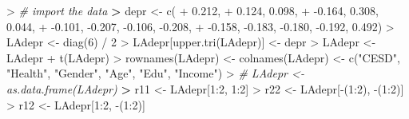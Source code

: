 \documentclass[
]{article}
\newenvironment{Shaded}{\begin{snugshade}}{\end{snugshade}}
\newcommand{\CommentTok}[1]{\textcolor[rgb]{0.56,0.35,0.01}{\textit{#1}}}
\newcommand{\DecValTok}[1]{\textcolor[rgb]{0.00,0.00,0.81}{#1}}
\newcommand{\ErrorTok}[1]{\textcolor[rgb]{0.64,0.00,0.00}{\textbf{#1}}}
\newcommand{\FloatTok}[1]{\textcolor[rgb]{0.00,0.00,0.81}{#1}}
\newcommand{\FunctionTok}[1]{\textcolor[rgb]{0.00,0.00,0.00}{#1}}
\newcommand{\NormalTok}[1]{#1}
\newcommand{\OtherTok}[1]{\textcolor[rgb]{0.56,0.35,0.01}{#1}}
\newcommand{\SpecialCharTok}[1]{\textcolor[rgb]{0.00,0.00,0.00}{#1}}
\newcommand{\StringTok}[1]{\textcolor[rgb]{0.31,0.60,0.02}{#1}}
\begin{document}
\begin{Shaded}
\begin{Highlighting}[]
\SpecialCharTok{\textgreater{}} \CommentTok{\# import the data}
\ErrorTok{\textgreater{}}\NormalTok{ depr }\OtherTok{\textless{}{-}} \FunctionTok{c}\NormalTok{(}
\SpecialCharTok{+}            \FloatTok{0.212}\NormalTok{,}
\SpecialCharTok{+}            \FloatTok{0.124}\NormalTok{,  }\FloatTok{0.098}\NormalTok{,}
\SpecialCharTok{+}           \SpecialCharTok{{-}}\FloatTok{0.164}\NormalTok{,  }\FloatTok{0.308}\NormalTok{,  }\FloatTok{0.044}\NormalTok{,}
\SpecialCharTok{+}           \SpecialCharTok{{-}}\FloatTok{0.101}\NormalTok{, }\SpecialCharTok{{-}}\FloatTok{0.207}\NormalTok{, }\SpecialCharTok{{-}}\FloatTok{0.106}\NormalTok{, }\SpecialCharTok{{-}}\FloatTok{0.208}\NormalTok{,}
\SpecialCharTok{+}           \SpecialCharTok{{-}}\FloatTok{0.158}\NormalTok{, }\SpecialCharTok{{-}}\FloatTok{0.183}\NormalTok{, }\SpecialCharTok{{-}}\FloatTok{0.180}\NormalTok{, }\SpecialCharTok{{-}}\FloatTok{0.192}\NormalTok{, }\FloatTok{0.492}\NormalTok{)}
\SpecialCharTok{\textgreater{}}\NormalTok{ LAdepr }\OtherTok{\textless{}{-}} \FunctionTok{diag}\NormalTok{(}\DecValTok{6}\NormalTok{) }\SpecialCharTok{/} \DecValTok{2}
\SpecialCharTok{\textgreater{}}\NormalTok{ LAdepr[}\FunctionTok{upper.tri}\NormalTok{(LAdepr)] }\OtherTok{\textless{}{-}}\NormalTok{ depr}
\SpecialCharTok{\textgreater{}}\NormalTok{ LAdepr }\OtherTok{\textless{}{-}}\NormalTok{ LAdepr }\SpecialCharTok{+} \FunctionTok{t}\NormalTok{(LAdepr)}
\SpecialCharTok{\textgreater{}} \FunctionTok{rownames}\NormalTok{(LAdepr) }\OtherTok{\textless{}{-}} \FunctionTok{colnames}\NormalTok{(LAdepr) }\OtherTok{\textless{}{-}} \FunctionTok{c}\NormalTok{(}\StringTok{"CESD"}\NormalTok{, }\StringTok{"Health"}\NormalTok{, }\StringTok{"Gender"}\NormalTok{, }\StringTok{"Age"}\NormalTok{, }\StringTok{"Edu"}\NormalTok{, }\StringTok{"Income"}\NormalTok{)}
\SpecialCharTok{\textgreater{}} \CommentTok{\# LAdepr \textless{}{-} as.data.frame(LAdepr)}
\ErrorTok{\textgreater{}}\NormalTok{ r11 }\OtherTok{\textless{}{-}}\NormalTok{ LAdepr[}\DecValTok{1}\SpecialCharTok{:}\DecValTok{2}\NormalTok{, }\DecValTok{1}\SpecialCharTok{:}\DecValTok{2}\NormalTok{]}
\SpecialCharTok{\textgreater{}}\NormalTok{ r22 }\OtherTok{\textless{}{-}}\NormalTok{ LAdepr[}\SpecialCharTok{{-}}\NormalTok{(}\DecValTok{1}\SpecialCharTok{:}\DecValTok{2}\NormalTok{), }\SpecialCharTok{{-}}\NormalTok{(}\DecValTok{1}\SpecialCharTok{:}\DecValTok{2}\NormalTok{)]}
\SpecialCharTok{\textgreater{}}\NormalTok{ r12 }\OtherTok{\textless{}{-}}\NormalTok{ LAdepr[}\DecValTok{1}\SpecialCharTok{:}\DecValTok{2}\NormalTok{, }\SpecialCharTok{{-}}\NormalTok{(}\DecValTok{1}\SpecialCharTok{:}\DecValTok{2}\NormalTok{)]}

\end{Highlighting}
\end{Shaded}
\end{document}
